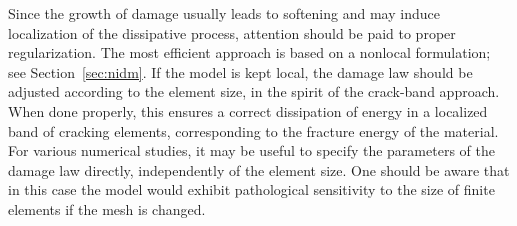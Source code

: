 \documentclass[a4paper]{article}
\begin{document}
Since the growth of damage usually leads to softening and may induce
localization of the dissipative process, attention should be paid
to proper regularization. The most efficient approach is based on
a nonlocal formulation; see Section~\ref{sec:nidm}. 
If the model is kept local, the damage law
should be adjusted according to the element size, in the spirit
of the crack-band approach. When done properly, this ensures
a correct dissipation of energy in a localized band of cracking
elements, corresponding to the fracture energy of the material.
For various numerical studies, it may be useful to specify the
parameters of the damage law directly, independently of the element size.
One should be aware that in this case the model would exhibit
pathological sensitivity to the size of finite elements if the mesh
is changed. 
\end{document}
